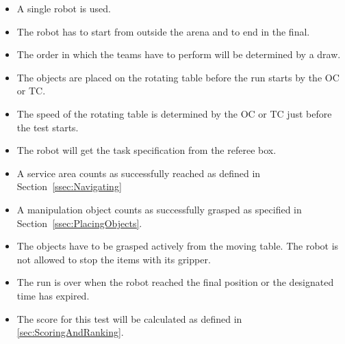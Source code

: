 \begin{itemize}
\item A single robot is used.
\item The robot has to start from outside the arena and to end in the final.
\item The order in which the teams have to perform will be determined by a draw.
\item The objects are placed on the rotating table before the run starts by the OC or TC.
\item The speed of the rotating table is determined by the OC or TC just before the test starts.
\item The robot will get the task specification from the referee box.
\item A service area counts as successfully reached as defined in Section~\ref{ssec:Navigating}
\item A manipulation object counts as successfully grasped as specified in Section~\ref{ssec:PlacingObjects}.
\item The objects have to be grasped actively from the moving table. The robot is not allowed to stop the items with its gripper.
\item The run is over when the robot reached the final position or the designated time has expired.
\item The score for this test will be calculated as defined in \ref{sec:ScoringAndRanking}.
\end{itemize}



%
%
